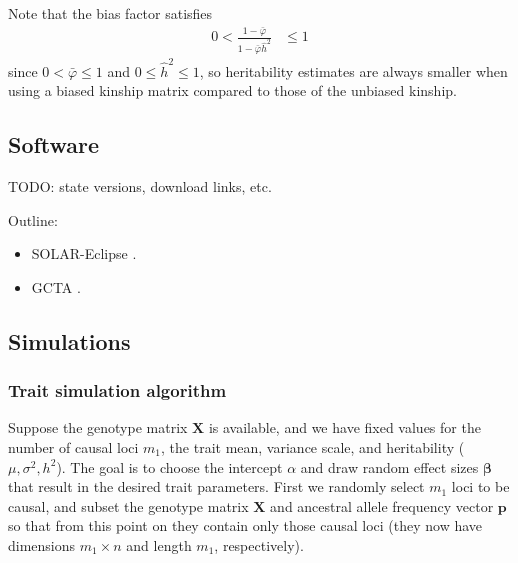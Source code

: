 \documentclass[11pt]{article}
\begin{document}
Note that the bias factor satisfies
\begin{align*}
  0 <
  \frac{
  1 - \bar{\varphi}
  }{
  1 - \bar{\varphi} \hat{h}^2
  }
  &\le
    1
\end{align*}
since $0 < \bar{\varphi} \le 1$ and $0 \le \hat{h}^2 \le 1$, so heritability estimates are always smaller when using a biased kinship matrix compared to those of the unbiased kinship.

\subsection{Software}

TODO: state versions, download links, etc.

Outline:
\begin{itemize}
\item SOLAR-Eclipse \citep{almasy_multipoint_1998}.
\item GCTA \citep{yang_gcta:_2011}.
\end{itemize}

\subsection{Simulations}

\subsubsection{Trait simulation algorithm}

Suppose the genotype matrix $\mathbf{X}$ is available, and we have fixed values for the number of causal loci $m_1$, the trait mean, variance scale, and heritability ($\mu, \sigma^2, h^2$).
The goal is to choose the intercept $\alpha$ and draw random effect sizes $\mathbf{\beta}$ that result in the desired trait parameters.
First we randomly select $m_1$ loci to be causal, and subset the genotype matrix $\mathbf{X}$ and ancestral allele frequency vector $\mathbf{p}$ so that from this point on they contain only those causal loci (they now have dimensions $m_1 \times n$ and length $m_1$, respectively).
\end{document}
